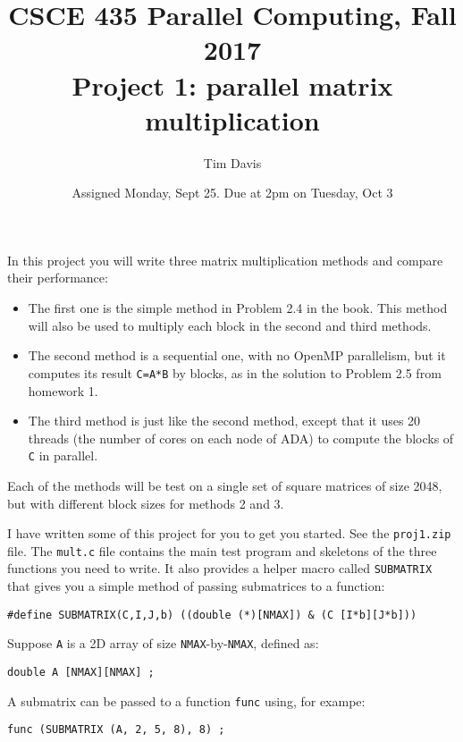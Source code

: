 \documentclass[11pt]{article}
\title{CSCE 435 Parallel Computing, Fall 2017 \\
Project 1: parallel matrix multiplication}
\author{Tim Davis}
\date{Assigned Monday, Sept 25.  Due at 2pm on Tuesday, Oct 3}
\begin{document}
\maketitle

In this project you will write three matrix multiplication methods
and compare their performance:

\begin{itemize}
\item The first one is the simple method
in Problem 2.4 in the book.  This method will also be used 
to multiply each block in the second and third methods.

\item The second method is a sequential one, with no OpenMP parallelism,
but it computes its result \verb'C=A*B' by blocks, as in the solution to
Problem 2.5 from homework 1.

\item The third method is just like the second method, except that it
uses 20 threads (the number of cores on each node of ADA) to compute the
blocks of \verb'C' in parallel.

\end{itemize}

Each of the methods will be test on a single set of square matrices of
size 2048, but with different block sizes for methods 2 and 3.

I have written some of this project for you to get you started.
See the \verb'proj1.zip' file.  The \verb'mult.c' file contains the main
test program and skeletons of the three functions you need to write.
It also provides a helper macro called \verb'SUBMATRIX' that gives you a
simple method of passing submatrices to a function:

\begin{verbatim}
#define SUBMATRIX(C,I,J,b) ((double (*)[NMAX]) & (C [I*b][J*b]))
\end{verbatim}

Suppose \verb'A' is a 2D array of size \verb'NMAX'-by-\verb'NMAX', defined
as:

\begin{verbatim}
double A [NMAX][NMAX] ;
\end{verbatim}

A submatrix can be passed to a function \verb'func' using, for exampe:

\begin{verbatim}
func (SUBMATRIX (A, 2, 5, 8), 8) ;
\end{verbatim}
\end{document}
